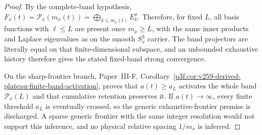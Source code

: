 \documentclass[12pt,a4paper]{article}
\begin{document}
\begin{proof}
By the complete-band hypothesis,
\(F_x(t)=\mathcal P_x(m_x(t))=\bigoplus_{k\le m_x(t)}E_k^x\).
Therefore, for fixed \(L\), all basis functions with \(\ell\le L\) are present
once \(m_x\ge L\), with the same inner products and Laplace eigenvalues as on
the smooth \(S^3_x\) carrier.  The band projectors are literally equal on that
finite-dimensional subspace, and an unbounded exhaustive history therefore
gives the stated fixed-band strong convergence.

On the sharp-frontier branch, Paper~III-F,
Corollary~\ref{p3f:cor:v259-derived-plateau-finite-band-activation}, proves
that \(a(t)\ge a_L\) activates the whole band \(\mathcal P_x(L)\) and that
cumulative retention preserves it.  If \(a(t)\to\infty\), every finite
threshold \(a_L\) is eventually crossed, so the generic exhaustive-frontier
premise is discharged.  A sparse generic frontier with the same integer
resolution would not support this inference, and no physical relative spacing
\(1/m_x\) is inferred.
\end{proof}
\end{document}
